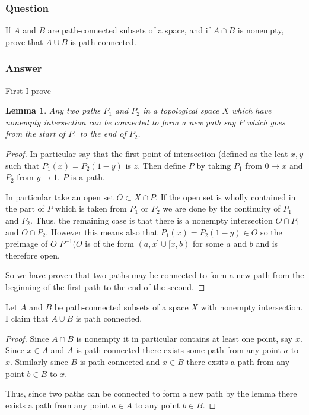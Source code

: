 \documentclass[10pt]{article}
\newtheorem{lemma}[theorem]{Lemma}
\begin{document}
\subsubsection{Question}
If $A$ and $B$ are path-connected subsets of a space, and if $A \cap B$ is nonempty, prove that $A \cup B$ is path-connected.
\subsubsection{Answer}

First I prove 
\begin{lemma}
Any two paths $P_1$ and $P_2$ in a topological space $X$ which have nonempty intersection can be connected to form a new path say $P$ which goes from the start of $P_1$ to the end of $P_2$.
\end{lemma}
\begin{proof}
In particular say that the first point of intersection (defined as the leat $x, y$ such that $P_1(x) = P_2(1-y)$  is $z$. Then define $P$ by taking $P_1$ from $0 \to x$ and $P_2 $ from $y \to 1$. $P$ is a path. 

In particular take an open set $O \subset X \cap P$. If the open set is wholly contained in the part of $P$ which is taken from $P_1$ or $P_2$ we are done by the continuity of $P_1$ and $P_2$. Thus, the remaining case is that there is a nonempty intersection $O \cap P_1$ and $O \cap P_2$. However this means also that $P_1(x) = P_2(1-y) \in O$ so the preimage of $O$ $P^{-1}(O$ is of the form $(a,x] \cup [x,b)$ for some $a$ and $b$ and is therefore open.

So we have proven that two paths may be connected to form a new path from the beginning of the first path to the end of the second.
\end{proof}


Let $A$ and $B$ be path-connected subsets of a space $X$ with nonempty intersection. I claim that $A \cup B$ is path connected.
\begin{proof}
Since $A\cap B$ is nonempty it in particular contains at least one point, say $x$. Since $x \in A $ and $A$ is path connected there exists some path from any point $a$ to $x$. Similarly since $B$ is path connected and $x \in B$ there exsits a path from any point $b \in B$ to $x$. 

Thus, since two paths can be connected  to form a new path by the lemma  there exists a path from any point $a \in A$ to any point $b\in B$. 
\end{proof}
\end{document}
